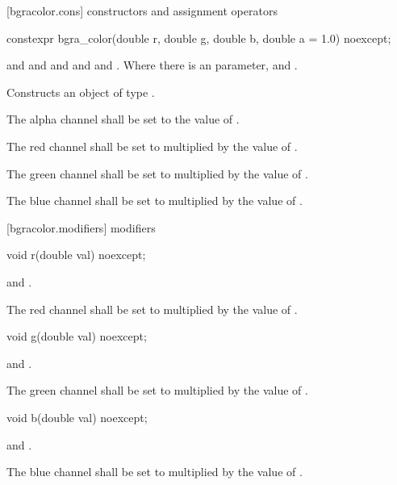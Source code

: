  [bgracolor.cons] { constructors and assignment operators}

\begin{itemdecl}
constexpr bgra_color(double r, double g, double b, double a = 1.0) noexcept;
\end{itemdecl}
\begin{itemdescr}
\pnum
\requires
{} and  and  and  and  and . Where there is an  parameter,  and .

\pnum
\effects
Constructs an object of type .

\pnum
The alpha channel shall be set to the value of .

\pnum
The red channel shall be set to  multiplied by the value of  .

\pnum
The green channel shall be set to  multiplied by the value of .

\pnum
The blue channel shall be set to  multiplied by the value of .
\end{itemdescr}

 [bgracolor.modifiers]{ modifiers}

\begin{itemdecl}
void r(double val) noexcept;
\end{itemdecl}

\begin{itemdescr}
\pnum
\requires
{} and .

\pnum
\effects
The red channel shall be set to  multiplied by the value of  .
\end{itemdescr}

\begin{itemdecl}
void g(double val) noexcept;
\end{itemdecl}
\begin{itemdescr}
\pnum
\requires
{} and .

\pnum
\effects
The green channel shall be set to  multiplied by the value of  .
\end{itemdescr}

\begin{itemdecl}
void b(double val) noexcept;
\end{itemdecl}
\begin{itemdescr}
\pnum
\requires
{} and .

\pnum
\effects
The blue channel shall be set to  multiplied by the value of  .
\end{itemdescr}

